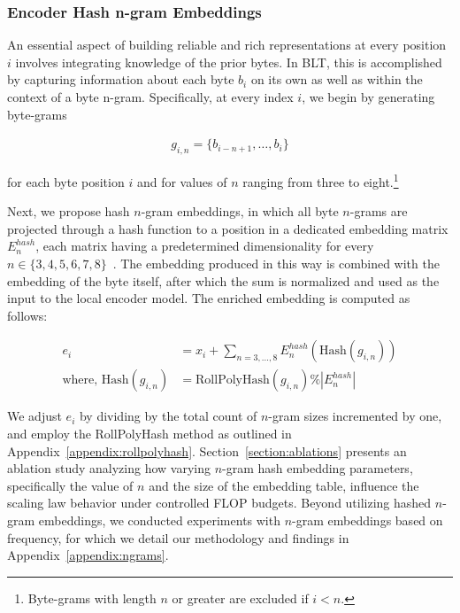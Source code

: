\subsubsection{Encoder Hash n-gram Embeddings}
\label{sec:ngram-emb}
\label{sec:hash-emb}
An essential aspect of building reliable and rich representations at every position $i$ involves integrating knowledge of the prior bytes. In {\textsc BLT}, this is accomplished by capturing information about each byte $b_i$ on its own as well as within the context of a byte n-gram. Specifically, at every index $i$, we begin by generating byte-grams

\begin{align}
    g_{i,n}=\{b_{i-n + 1},\ldots, b_i\}
\end{align}

for each byte position $i$ and for values of $n$ ranging from three to eight.\footnote{
Byte-grams with length $n$ or greater are excluded if $i < n$.}

Next, we propose hash $n$-gram embeddings, in which all byte $n$-grams are projected through a hash function to a position in a dedicated embedding matrix $E_{n}^{hash}$, each matrix having a predetermined dimensionality for every $n \in\{3,4,5,6,7,8\}$~\citep{bai2010learning}.
The embedding produced in this way is combined with the embedding of the byte itself, after which the sum is normalized and used as the input to the local encoder model. The enriched embedding is computed as follows:

\begin{align}
e_i &= x_i + \sum_{n = 3,...,8}E_{n}^{hash}(\text{Hash}(g_{i,n})) \\
\text{where, Hash}(g_{i,n}) &= \text{RollPolyHash}(g_{i,n}) \% |E_{n}^{hash}|
\end{align}

We adjust $e_i$ by dividing by the total count of $n$-gram sizes incremented by one, and employ the RollPolyHash method as outlined in Appendix~\ref{appendix:rollpolyhash}. Section~\ref{section:ablations} presents an ablation study analyzing how varying $n$-gram hash embedding parameters, specifically the value of $n$ and the size of the embedding table, influence the scaling law behavior under controlled FLOP budgets. Beyond utilizing hashed $n$-gram embeddings, we conducted experiments with $n$-gram embeddings based on frequency, for which we detail our methodology and findings in Appendix~\ref{appendix:ngrams}.

